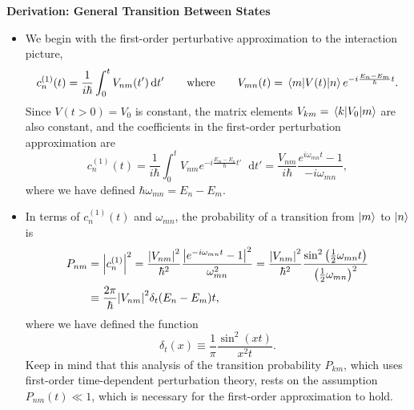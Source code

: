 \documentclass[11pt, a4paper]{article}
\newcommand{\diff}{\mathop{}\!\mathrm{d}} %
\begin{document}
\textbf{Derivation: General Transition Between States}
\begin{itemize}

    \item We begin with the first-order perturbative approximation to the interaction picture, 
    \begin{equation*}
        c_{n}^{(1)}(t) = \frac{1}{i \hbar} \int_{0}^{t}V_{nm}(t')\diff t' \qquad \text{where} \qquad V_{mn}(t) = \mel{m}{V(t)}{n} e^{-i \frac{E_{n} - E_{m}}{\hbar}t}.
    \end{equation*}
    Since $ V(t > 0) = V_{0} $ is constant, the matrix elements $ V_{km} = \mel{k}{V_{0}}{m} $ are also constant, and the coefficients in the first-order perturbation approximation are
    \begin{equation*}
        c_{n}^{(1)}(t) = \frac{1}{i \hbar} \int_{0}^{t} V_{nm}e^{-i \frac{E_{m} - E_{n}}{\hbar}t'} \diff t' = \frac{V_{nm}}{i \hbar} \frac{e^{i\omega_{mn}t} - 1}{- i \omega_{mn}},
    \end{equation*}
    where we have defined $ \hbar \omega_{mn} = E_{n} - E_{m} $. 

    \item In terms of $ c_{n}^{(1)}(t) $ and $ \omega_{mn} $, the probability of a transition from $ \ket{m} $ to $ \ket{n} $ is
    \begin{align*}
        P_{nm} &= \abs{c_{n}^{(1)}}^{2} = \frac{\abs{V_{nm}}^{2}}{\hbar^{2}} \frac{\abs{e^{-i\omega_{mn}t} - 1}^{2}}{\omega^{2}_{mn}} = \frac{\abs{V_{nm}}^{2}}{\hbar^{2}} \frac{\sin^{2}\left( \tfrac{1}{2} \omega_{mn}t \right)}{\left( \tfrac{1}{2}\omega_{mn} \right)^{2}}\\
        & \equiv \frac{2\pi}{\hbar}\abs{V_{nm}}^{2} \delta_{t}(E_{n} - E_{m})t,
    \end{align*}
    where we have defined the function
    \begin{equation*}
        \delta_{t}(x) \equiv \frac{1}{\pi} \frac{\sin^{2}(xt)}{x^{2}t}.
    \end{equation*}
    Keep in mind that this analysis of the transition probability $ P_{km} $, which uses first-order time-dependent perturbation theory, rests on the assumption $ P_{nm}(t) \ll 1 $, which is necessary for the first-order approximation to hold.

\end{itemize}
\end{document}
